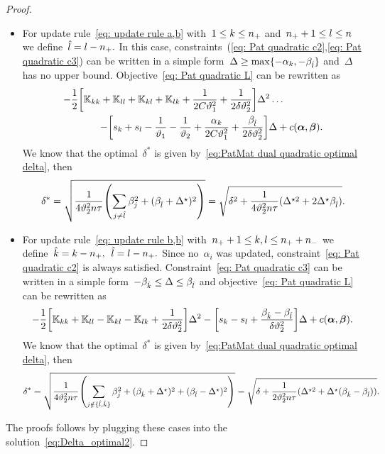 \begin{proof}
\begin{itemize}
    \item For update rule~\eqref{eq: update rule a,b} with~$1 \le k \le n_{+}$ and~$n_{+} + 1 \le l \le n$ we define~$\hat{l} = l - n_{+}.$ In this case, constraints~(\ref{eq: Pat quadratic c2},\ref{eq: Pat quadratic c3}) can be written in a simple form~$\Delta \geq \max \{- \alpha_k, - \beta_{\hat{l}}\}$ and~$\Delta$ has no upper bound. Objective~\eqref{eq: Pat quadratic L} can be rewritten as
    \begin{equation*}
      \begin{split}
        - \frac{1}{2} \Brac[s]{\K_{kk} + \K_{ll} + \K_{kl} + \K_{lk} + \frac{1}{2C\vartheta_1^2} + \frac{1}{2\delta\vartheta_2^2}} \Delta^2 \dots \qquad\qquad \\ 
        - \Brac[s]{s_k + s_l - \frac{1}{\vartheta_1} - \frac{1}{\vartheta_2} + \frac{\alphak}{2C\vartheta_1^2} + \frac{\betal}{2\delta\vartheta_2^2}} \Delta + c(\bm{\alpha}, \bm{\beta}).
      \end{split}
    \end{equation*}
    We know that the optimal~$\delta^*$ is given by~\eqref{eq:PatMat dual quadratic optimal delta}, then
    \begin{equation*}
      \delta^*
      = \sqrt{\frac{1}{4\vartheta_2^2 n \tau} \Brac{\sum_{j\neq \hat{l}} \beta_j^2 + (\betal + \Delta^\star)^2}}
      = \sqrt{\delta^2 + \frac{1}{4\vartheta_2^2 n \tau} (\Delta^{\star2} + 2\Delta^\star \betal)}.
    \end{equation*}

    \item For update rule~\eqref{eq: update rule b,b} with~$n_{+} + 1\le k,l \le n_{+} + n_{-}$ we define~$\hat{k} = k - n_{+},$~$\hat{l} = l - n_{+}.$ Since no~$\alpha_i$ was updated, constraint~\eqref{eq: Pat quadratic c2} is always satisfied. Constraint~\eqref{eq: Pat quadratic c3} can be written in a simple form~$-\beta_{\hat{k}} \leq \Delta \leq \beta_{\hat{l}}$ and objective~\eqref{eq: Pat quadratic L} can be rewritten as
    \begin{equation*}
      - \frac{1}{2} \Brac[s]{\K_{kk} + \K_{ll} - \K_{kl} - \K_{lk} + \frac{1}{2\delta\vartheta_2^2}} \Delta^2 - \Brac[s]{s_k - s_l + \frac{\betak - \betal}{\delta\vartheta_2^2}} \Delta + c(\bm{\alpha}, \bm{\beta}).
    \end{equation*}
    We know that the optimal~$\delta^*$ is given by~\eqref{eq:PatMat dual quadratic optimal delta}, then
    \begin{equation*}
      \delta^*
      = \sqrt{\frac{1}{4\vartheta_2^2 n \tau} \Brac{\sum_{j \notin \{\hat{l}, \hat{k}\}} \beta_j^2 + (\betak + \Delta^\star)^2 + (\betal - \Delta^\star)^2}} 
      = \sqrt{\delta + \frac{1}{2\vartheta_2^2 n \tau} (\Delta^{\star2} + \Delta^\star (\betak - \betal))}.
    \end{equation*}
  \end{itemize}
  The proofs follows by plugging these cases into the solution~\eqref{eq:Delta_optimal2}.
\end{proof}
